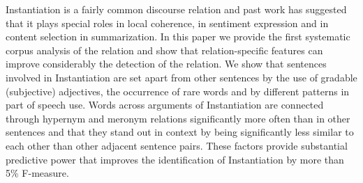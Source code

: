 Instantiation is a fairly common discourse relation and past work has suggested that it plays special roles in local coherence, in sentiment expression and in content selection in summarization. In this paper we provide the first systematic corpus analysis of the relation and show that relation-specific features can improve considerably the detection of the relation.  We show that sentences involved in Instantiation are set apart from other sentences by the use of gradable (subjective) adjectives, the occurrence of rare words and by different patterns in part of speech use. Words across arguments of Instantiation are connected through hypernym and meronym relations significantly more often than in other sentences and that they stand out in context by being significantly less similar to each other than other adjacent sentence pairs. These factors provide substantial predictive power that improves the identification of Instantiation by more than 5\% F-measure.
